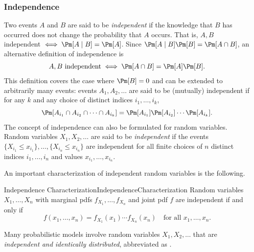 \subsubsection{Independence}
Two events $A$ and $B$ are said to be \textit{independent} if the knowledge that $B$ has occurred does not change the probability that $A$ occurs. That is, $A, B$ independent $\iff \Pm[A \mid B] = \Pm[A]$. Since $\Pm[A \mid B] \Pm[B] = \Pm[A \cap B]$, an alternative definition of independence is
\begin{equation*}
	A, B \text{ independent} \iff \Pm[A \cap B] = \Pm[A]\Pm[B].
\end{equation*}
This definition covers the case where $\Pm[B] = 0$ and can be extended to arbitrarily many events: events $A_1, A_2, \dots$ are said to be (mutually) independent if for any $k$ and any choice of distinct indices $i_1, \dots, i_k$,
\begin{equation*}
	\Pm[A_{i_1} \cap A_{i_2} \cap \dots \cap A_{i_k}] = \Pm[A_{i_1}] \Pm[A_{i_2}] \cdots \Pm[A_{i_k}].
\end{equation*}
The concept of independence can also be formulated for random variables. Random variables $X_1, X_2, \dots$ are said to be \textit{independent} if the events $\{X_{i_1} \le x_{i_1}\}, \dots, \{X_{i_n} \le x_{i_n}\}$ are independent for all finite choices of $n$ distinct indices $i_1, \dots, i_n$ and values $x_{i_1}, \dots, x_{i_n}$.

An important characterization of independent random variables is the following.

\begin{thm}{Independence Characterization}{IndependenceCharacterization}
	Random variables $X_1, \dots, X_n$ with marginal pdfs $f_{X_1}, \dots, f_{X_n}$ and joint pdf $f$ are independent if and only if
	\begin{equation}
		f(x_1, \dots, x_n) = f_{X_1}(x_1) \cdots f_{X_n}(x_n) \quad \text{for all } x_1, \dots, x_n. \label{eq:IndependencePDF}
	\end{equation}
\end{thm}

Many probabilistic models involve random variables $X_1, X_2, \dots$ that are \textit{independent and identically distributed}, abbreviated as \iid.

